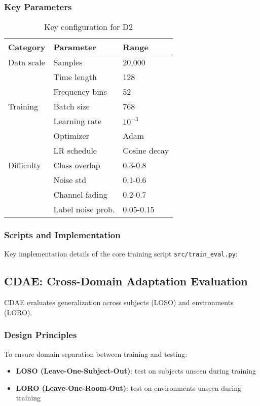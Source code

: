\subsubsection{Key Parameters}
\begin{table}[h]
\centering
\caption{Key configuration for D2}
\label{tab:d2_parameters}
\begin{tabular}{@{}lll@{}}
\toprule
Category & Parameter & Range \\
\midrule
Data scale & Samples & 20,000 \\
& Time length & 128 \\
& Frequency bins & 52 \\
\midrule
Training & Batch size & 768 \\
& Learning rate & $10^{-3}$ \\
& Optimizer & Adam \\
& LR schedule & Cosine decay \\
\midrule
Difficulty & Class overlap & 0.3-0.8 \\
& Noise std & 0.1-0.6 \\
& Channel fading & 0.2-0.7 \\
& Label noise prob. & 0.05-0.15 \\
\bottomrule
\end{tabular}
\end{table}

\subsubsection{Scripts and Implementation}
Key implementation details of the core training script \texttt{src/train\_eval.py}:

\subsection{CDAE: Cross-Domain Adaptation Evaluation}
\label{subsec:cdae_protocol}

CDAE evaluates generalization across subjects (LOSO) and environments (LORO).

\subsubsection{Design Principles}
To ensure domain separation between training and testing:

\begin{itemize}
\item \textbf{LOSO (Leave-One-Subject-Out)}: test on subjects unseen during training
\item \textbf{LORO (Leave-One-Room-Out)}: test on environments unseen during training
\end{itemize}

